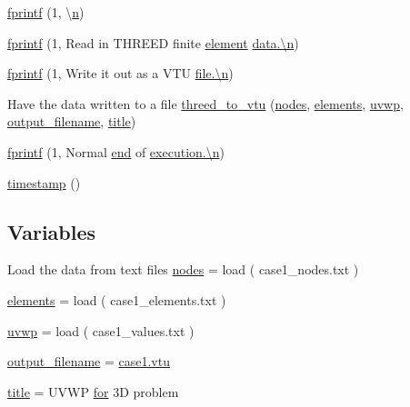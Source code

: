 \begin{DoxyCompactItemize}
\item 
\hyperlink{a00617_a8e4a0930102fdc798344d4c081733707}{fprintf} (1, \textquotesingle{}\textbackslash{}\hyperlink{a00623_a781a04ab095280f838ff3eb0e51312e0}{n}\textquotesingle{})
\item 
\hyperlink{a00617_aa9cb6427f3235e7bccd5059d78be44b6}{fprintf} (1, \textquotesingle{} Read in T\+H\+R\+E\+ED finite \hyperlink{a00611_a4998e7f4989562d1ed06579e07265c30}{element} \hyperlink{a00623_a781a04ab095280f838ff3eb0e51312e0}{data.\textbackslash{}n}\textquotesingle{})
\item 
\hyperlink{a00617_afaf4ed320488f09d655d5216e9585c6c}{fprintf} (1, \textquotesingle{} Write it out as a V\+TU \hyperlink{a00623_a781a04ab095280f838ff3eb0e51312e0}{file.\textbackslash{}n}\textquotesingle{})
\item 
Have the data written to a file \hyperlink{a00617_a567a88cd618055bb768d60cceab0b06e}{threed\+\_\+to\+\_\+vtu} (\hyperlink{a00608_a9fd973fb7dcbed4123ae5eb2f3868e61}{nodes}, \hyperlink{a00617_aa9aaa650bacb9b91c82437c2ce48f50c}{elements}, \hyperlink{a00617_a9c137ebda5c84e833481db1dd6531003}{uvwp}, \hyperlink{a00617_a5934d690c688edbd92210f38fe5855e7}{output\+\_\+filename}, \hyperlink{a00617_a051e403214cb6872ad3fe4e50302a6ee}{title})
\item 
\hyperlink{a00617_ad4d733a8aea349b87b5481e032119d5a}{fprintf} (1, \textquotesingle{} Normal \hyperlink{a00608_afb358f48b1646c750fb9da6c6585be2b}{end} of \hyperlink{a00623_a781a04ab095280f838ff3eb0e51312e0}{execution.\textbackslash{}n}\textquotesingle{})
\item 
\hyperlink{a00617_a827637c36d710b7c19476fbff9c107d2}{timestamp} ()
\end{DoxyCompactItemize}
\subsection*{Variables}
\begin{DoxyCompactItemize}
\item 
Load the data from text files \hyperlink{a00617_ada591513d233d88048edf5b661293d3f}{nodes} = load ( \textquotesingle{}case1\+\_\+nodes.\+txt\textquotesingle{} )
\item 
\hyperlink{a00617_aa9aaa650bacb9b91c82437c2ce48f50c}{elements} = load ( \textquotesingle{}case1\+\_\+elements.\+txt\textquotesingle{} )
\item 
\hyperlink{a00617_a9c137ebda5c84e833481db1dd6531003}{uvwp} = load ( \textquotesingle{}case1\+\_\+values.\+txt\textquotesingle{} )
\item 
\hyperlink{a00617_a5934d690c688edbd92210f38fe5855e7}{output\+\_\+filename} = \textquotesingle{}\hyperlink{a00473_af4c53a4aa4d5d3e1700b6e53de79a026}{case1.\+vtu}\textquotesingle{}
\item 
\hyperlink{a00617_a051e403214cb6872ad3fe4e50302a6ee}{title} = \textquotesingle{}U\+V\+WP \hyperlink{a00623_ad1e7380d51df1e0043d24d3c8a860e0a}{for} 3\+D problem\textquotesingle{}
\end{DoxyCompactItemize}


